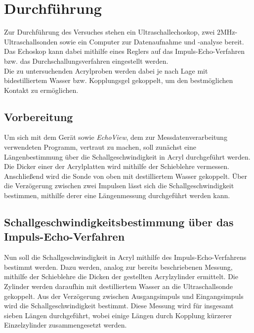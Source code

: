 \section{Durchführung}
\label{sec:Durchführung}

Zur Durchführung des Versuches stehen ein Ultraschallechoskop, zwei $2 \unit{\mega\hertz}$-Ultraschallsonden sowie ein Computer zur Datenaufnahme und -analyse bereit.
Das Echoskop kann dabei mithilfe eines Reglers auf das Impuls-Echo-Verfahren bzw. das Durchschallungsverfahren eingestellt werden. \\

Die zu untersuchenden Acrylproben werden dabei je nach Lage mit bidestilliertem Wasser bzw. Kopplungsgel gekoppelt, um den bestmöglichen Kontakt zu ermöglichen. \\


\subsection{Vorbereitung}

Um sich mit dem Gerät sowie \textit{EchoView}, dem zur Messdatenverarbeitung verwendeten Programm, vertraut zu machen, soll zunächst eine Längenbestimmung über die Schallgeschwindigkeit in Acryl durchgeführt werden.
Die Dicker einer der Acrylplatten wird mithilfe der Schieblehre vermessen. Anschließend wird die Sonde von oben mit destilliertem Wasser gekoppelt. %
Über die Verzögerung zwischen zwei Impulsen lässt sich die Schallgeschwindigkeit bestimmen, mithilfe derer eine Längenmessung durchgeführt werden kann. \\


\subsection{Schallgeschwindigkeitsbestimmung über das Impuls-Echo-Verfahren}

Nun soll die Schallgeschwindigkeit in Acryl mithilfe des Impuls-Echo-Verfahrens bestimmt werden.
Dazu werden, analog zur bereits beschriebenen Messung, mithilfe der Schieblehre die Dicken der gestellten Acrylzylinder ermittelt.
Die Zylinder werden daraufhin mit destilliertem Wasser an die Ultraschallsonde gekoppelt. Aus der Verzögerung zwischen Ausgangsimpuls und Eingangsimpuls wird die Schallgeschwindigkeit bestimmt. %
Diese Messung wird für insgesamt sieben Längen durchgeführt, wobei einige Längen durch Kopplung kürzerer Einzelzylinder zusammengesetzt werden. \\


